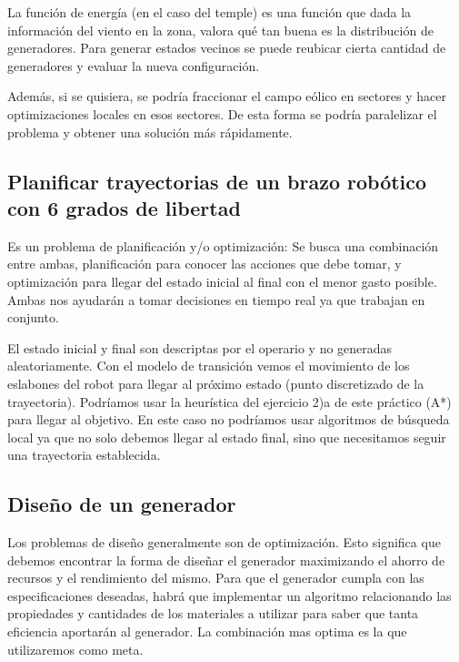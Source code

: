 \documentclass[
]{article}
\begin{document}
La función de energía (en el caso del temple) es una función que dada la
información del viento en la zona, valora qué tan buena es la
distribución de generadores. Para generar estados vecinos se puede
reubicar cierta cantidad de generadores y evaluar la nueva
configuración.

Además, si se quisiera, se podría fraccionar el campo eólico en sectores
y hacer optimizaciones locales en esos sectores. De esta forma se podría
paralelizar el problema y obtener una solución más rápidamente.

\hypertarget{planificar-trayectorias-de-un-brazo-robuxf3tico-con-6-grados-de-libertad}{%
\subsection{Planificar trayectorias de un brazo robótico con 6 grados de
libertad}\label{planificar-trayectorias-de-un-brazo-robuxf3tico-con-6-grados-de-libertad}}

Es un problema de planificación y/o optimización: Se busca una
combinación entre ambas, planificación para conocer las acciones que
debe tomar, y optimización para llegar del estado inicial al final con
el menor gasto posible. Ambas nos ayudarán a tomar decisiones en tiempo
real ya que trabajan en conjunto.

El estado inicial y final son descriptas por el operario y no generadas
aleatoriamente. Con el modelo de transición vemos el movimiento de los
eslabones del robot para llegar al próximo estado (punto discretizado de
la trayectoria). Podríamos usar la heurística del ejercicio 2)a de este
práctico (A*) para llegar al objetivo. En este caso no podríamos usar
algoritmos de búsqueda local ya que no solo debemos llegar al estado
final, sino que necesitamos seguir una trayectoria establecida.

\hypertarget{diseuxf1o-de-un-generador}{%
\subsection{Diseño de un generador}\label{diseuxf1o-de-un-generador}}

Los problemas de diseño generalmente son de optimización. Esto significa
que debemos encontrar la forma de diseñar el generador maximizando el
ahorro de recursos y el rendimiento del mismo. Para que el generador
cumpla con las especificaciones deseadas, habrá que implementar un
algoritmo relacionando las propiedades y cantidades de los materiales a
utilizar para saber que tanta eficiencia aportarán al generador. La
combinación mas optima es la que utilizaremos como meta.
\end{document}
